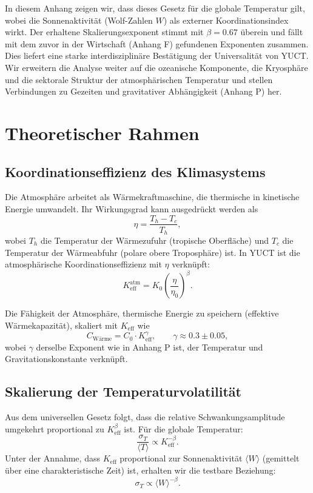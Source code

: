 \documentclass[12pt,a4paper]{article}
\newcommand{\Keff}{K_{\mathrm{eff}}}
\newcommand{\be}{\beta}
\newcommand{\ga}{\gamma}
\begin{document}
	In diesem Anhang zeigen wir, dass dieses Gesetz für die globale Temperatur gilt, wobei die Sonnenaktivität (Wolf-Zahlen \(W\)) als externer Koordinationsindex wirkt. Der erhaltene Skalierungsexponent stimmt mit \(\be = 0.67\) überein und fällt mit dem zuvor in der Wirtschaft (Anhang F) gefundenen Exponenten zusammen. Dies liefert eine starke interdisziplinäre Bestätigung der Universalität von YUCT. Wir erweitern die Analyse weiter auf die ozeanische Komponente, die Kryosphäre und die sektorale Struktur der atmosphärischen Temperatur und stellen Verbindungen zu Gezeiten und gravitativer Abhängigkeit (Anhang P) her.
	
	\section{Theoretischer Rahmen}
	
	\subsection{Koordinationseffizienz des Klimasystems}
	
	Die Atmosphäre arbeitet als Wärmekraftmaschine, die thermische in kinetische Energie umwandelt. Ihr Wirkungsgrad kann ausgedrückt werden als
	\[
	\eta = \frac{T_h - T_c}{T_h},
	\]
	wobei \(T_h\) die Temperatur der Wärmezufuhr (tropische Oberfläche) und \(T_c\) die Temperatur der Wärmeabfuhr (polare obere Troposphäre) ist. In YUCT ist die atmosphärische Koordinationseffizienz mit \(\eta\) verknüpft:
	\[
	\Keff^{\text{atm}} = K_0 \left( \frac{\eta}{\eta_0} \right)^{\be}.
	\]
	
	Die Fähigkeit der Atmosphäre, thermische Energie zu speichern (effektive Wärmekapazität), skaliert mit \(\Keff\) wie
	\[
	C_{\text{Wärme}} = C_0 \cdot \Keff^{\ga}, \qquad \ga \approx 0.3 \pm 0.05,
	\]
	wobei \(\ga\) derselbe Exponent wie in Anhang P ist, der Temperatur und Gravitationskonstante verknüpft.
	
	\subsection{Skalierung der Temperaturvolatilität}
	
	Aus dem universellen Gesetz folgt, dass die relative Schwankungsamplitude umgekehrt proportional zu \(\Keff^{\be}\) ist. Für die globale Temperatur:
	\[
	\frac{\sigma_T}{\langle T \rangle} \propto \Keff^{-\be}.
	\]
	Unter der Annahme, dass \(\Keff\) proportional zur Sonnenaktivität \(\langle W \rangle\) (gemittelt über eine charakteristische Zeit) ist, erhalten wir die testbare Beziehung:
	\[
	\sigma_T \propto \langle W \rangle^{-\be}.
	\]
	
\end{document}
